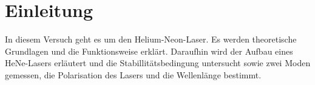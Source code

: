 \section{Einleitung}
In diesem Versuch geht es um den Helium-Neon-Laser. Es werden theoretische Grundlagen und die Funktionsweise erklärt. Daraufhin wird der Aufbau eines HeNe-Lasers erläutert und die Stabillitätsbedingung untersucht sowie zwei Moden gemessen, die Polarisation des Lasers und die Wellenlänge bestimmt.